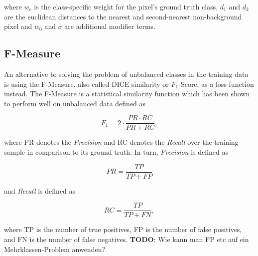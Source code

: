 \noindent where $w_c$ is the class-specific weight for the pixel's ground truth class, $d_1$ and $d_2$ are the euclidean distances to the nearest and second-nearest non-background pixel and $w_0$ and $\sigma$ are additional modifier terms. 

		\subsection{F-Measure}

An alternative to solving the problem of unbalanced classes in the training data is using the F-Measure, also called DICE similarity or $F_1$-Score, as a loss function instead. The F-Measure is a statistical similarity function which has been shown to perform well on unbalanced data\cite{fmeasure1}\cite{fmeasure2}\cite{fmeasure3} defined as

\[F_1 = 2 \cdot \frac{PR \cdot RC}{PR + RC},\]

\noindent where PR denotes the \textit{Precision} and RC denotes the \textit{Recall} over the training sample in comparison to its ground truth. In turn, \textit{Precision} is defined as

\[PR = \frac{TP}{TP + FP}\]

\noindent and \textit{Recall} is defined as

\[RC = \frac{TP}{TP + FN},\]

\noindent where TP is the number of true positives, FP is the number of false positives, and FN is the number of false negatives. \textbf{TODO}: Wie kann man FP etc auf ein Mehrklassen-Problem anwenden?
